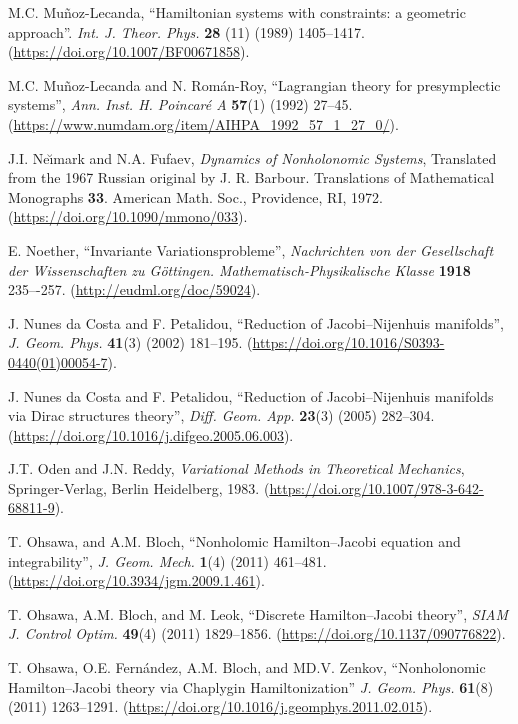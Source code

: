 \documentclass[12pt]{report}
\begin{document}
\begin{thebibliography}{999}
M.C. Mu\~noz-Lecanda,
``Hamiltonian systems with constraints: a geometric approach''.
{\sl Int. J. Theor. Phys.} {\bf 28} (11) (1989) 1405--1417.
(\url{https://doi.org/10.1007/BF00671858}).

M.C. Mu\~noz-Lecanda and N. Rom\'an-Roy, 
``Lagrangian theory for presymplectic systems'', 
{\sl Ann. Inst. H. Poincar\'e A} {\bf 57}(1) (1992) 27--45. 
(\url{https://www.numdam.org/item/AIHPA_1992_57_1_27_0/}).

J.I. Ne\u{\i}mark and N.A. Fufaev, 
{\it Dynamics of Nonholonomic Systems}, 
Translated from the 1967 Russian original by J. R. Barbour. Translations of Mathematical Monographs {\bf 33}. American Math. Soc., Providence, RI, 1972.%
(\url{https://doi.org/10.1090/mmono/033}).

 E. Noether, ``Invariante Variationsprobleme'', {\sl Nachrichten von der Gesellschaft der Wissenschaften zu Göttingen. Mathematisch-Physikalische Klasse} {\bf 1918} 235–-257.
(\url{http://eudml.org/doc/59024}).

J. Nunes da Costa and F. Petalidou,
``Reduction of Jacobi--Nijenhuis manifolds'',
{\sl J. Geom. Phys.} {\bf 41}(3) (2002) 181--195.
(\url{https://doi.org/10.1016/S0393-0440(01)00054-7}).

J. Nunes da Costa and F. Petalidou,
``Reduction of Jacobi--Nijenhuis manifolds via Dirac structures theory'',
{\sl Diff. Geom. App.} {\bf 23}(3) (2005) 282--304.
(\url{https://doi.org/10.1016/j.difgeo.2005.06.003}).

J.T. Oden and J.N. Reddy,
{\it Variational Methods in Theoretical Mechanics},
Springer-Verlag, Berlin Heidelberg, 1983.
(\url{https://doi.org/10.1007/978-3-642-68811-9}).

T. Ohsawa, and A.M. Bloch, 
``Nonholomic Hamilton--Jacobi equation and integrability'',
 {\sl J. Geom. Mech.} {\bf 1}(4) (2011) 461--481.
(\url{https://doi.org/10.3934/jgm.2009.1.461}).

T. Ohsawa, A.M. Bloch, and M. Leok,
 ``Discrete Hamilton--Jacobi theory'', 
{\sl SIAM J. Control Optim.} {\bf 49}(4) (2011) 1829--1856.
(\url{https://doi.org/10.1137/090776822}).

T. Ohsawa, O.E. Fern\'andez, A.M. Bloch, and MD.V. Zenkov, ``Nonholonomic Hamilton--Jacobi
theory via Chaplygin Hamiltonization''
 {\sl J. Geom. Phys.} {\bf 61}(8) (2011) 1263--1291.
\newblock (\url{https://doi.org/10.1016/j.geomphys.2011.02.015}).


\end{thebibliography}
\end{document}
